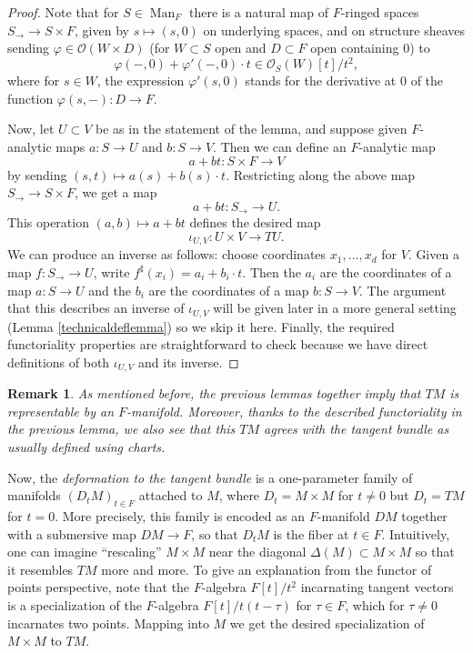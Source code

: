 \documentclass[12pt]{article}
\newtheorem{remark}[theorem]{Remark}
\begin{document}
\begin{proof}
Note that for $S\in\operatorname{Man}_F$ there is a natural map of $F$-ringed spaces $S_\rightarrow \rightarrow S\times F$, given by $s\mapsto (s,0)$ on underlying spaces, and on structure sheaves sending $\varphi\in \mathcal{O}(W\times D)$ (for $W\subset S$ open and $D\subset F$ open containing $0$) to
$$\varphi(-,0) + \varphi'(-,0)\cdot t \in \mathcal{O}_S(W)[t]/t^2,$$
where for $s\in W$, the expression $\varphi'(s,0)$ stands for the derivative at $0$ of the function $\varphi(s,-):D\rightarrow F$.

Now, let $U\subset V$ be as in the statement of the lemma, and suppose given $F$-analytic maps $a:S\rightarrow U$ and $b:S\rightarrow V$.  Then we can define an $F$-analytic map
$$a+bt: S\times F\rightarrow V$$
by sending $(s,t)\mapsto a(s)+b(s)\cdot t$.  Restricting along the above map $S_\rightarrow\rightarrow S\times F$, we get a map
$$a+bt: S_{\rightarrow}\rightarrow U.$$
This operation $(a,b)\mapsto a+bt$ defines the desired map
$$\iota_{U,V}: U\times V\rightarrow TU.$$
We can produce an inverse as follows: choose coordinates $x_1,\ldots,x_d$ for $V$.  Given a map $f:S_\rightarrow \rightarrow U$, write $f^\sharp(x_i) = a_i + b_i\cdot t$.  Then the $a_i$ are the coordinates of a map $a:S\rightarrow U$ and the $b_i$ are the coordinates of a map $b:S\rightarrow V$.  The argument that this describes an inverse of $\iota_{U,V}$ will be given later in a more general setting (Lemma \ref{technicaldeflemma}) so we skip it here.  Finally, the required functoriality properties are straightforward to check because we have direct definitions of both $\iota_{U,V}$ and its inverse.
\end{proof}

\begin{remark}
As mentioned before, the previous lemmas together imply that $TM$ is representable by an $F$-manifold.  Moreover, thanks to the described functoriality in the previous lemma, we also see that this $TM$ agrees with the tangent bundle as usually defined using charts.
\end{remark}


Now, the \emph{deformation to the tangent bundle} is a one-parameter family of manifolds $(D_tM)_{t\in F}$ attached to $M$, where $D_t=M\times M$ for $t\neq 0$ but $D_t = TM$ for $t=0$.  More precisely, this family is encoded as an $F$-manifold $DM$ together with a submersive map $DM\rightarrow F$, so that $D_tM$ is the fiber at $t\in F$.  Intuitively, one can imagine ``rescaling'' $M\times M$ near the diagonal $\Delta(M)\subset M\times M$ so that it resembles $TM$ more and more.  To give an explanation from the functor of points perspective, note that the $F$-algebra $F[t]/t^2$ incarnating tangent vectors is a specialization of the $F$-algebra $F[t]/t(t-\tau)$ for $\tau\in F$, which for $\tau\neq 0$ incarnates two points.  Mapping into $M$ we get the desired specialization of $M\times M$ to $TM$.
\end{document}
